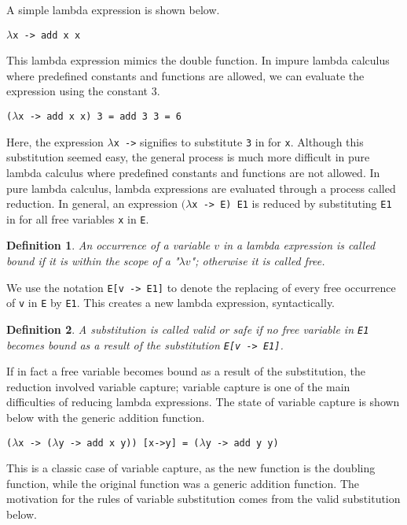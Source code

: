 \documentclass[11pt]{article}
\newtheorem{definition}{Definition}
\begin{document}
A simple lambda expression is shown below.


\hspace{2cm}\texttt{$\lambda$x -> add x x}


This lambda expression mimics the double function. In impure lambda calculus where predefined constants and functions are allowed, we can evaluate the expression using the constant 3.

\hspace{2cm}\texttt{($\lambda$x -> add x x) 3 = add 3 3 = 6}

Here, the expression \texttt{$\lambda$x ->} signifies to substitute \texttt{3} in for \texttt{x}. Although this substitution seemed easy, the general process is much more difficult in pure lambda calculus where predefined constants and functions are not allowed. In pure lambda calculus, lambda expressions are evaluated through a process called reduction. In general, an expression \texttt{$(\lambda$x -> E) E1} is reduced by substituting \texttt{E1} in for all free variables \texttt{x} in \texttt{E}. 

\begin{definition}
An occurrence of a variable $v$ in a lambda expression is called bound if it is within the scope of a "$\lambda v$"; otherwise it is called free.
\end{definition}

We use the notation \texttt{E[v -> E1]} to denote the replacing of every free occurrence of \texttt{v} in \texttt{E} by \texttt{E1}. This creates a new lambda expression, syntactically.

\begin{definition}
A substitution is called valid or safe if no free variable in \emph{\texttt{E1}} becomes bound as a result of the substitution \emph{\texttt{E[v -> E1]}}.
\end{definition}

If in fact a free variable becomes bound as a result of the substitution, the reduction involved variable capture; variable capture is one of the main difficulties of reducing lambda expressions. The state of variable capture is shown below with the generic addition function. 

\hspace{2cm}\texttt{($\lambda$x -> ($\lambda$y -> add x y)) [x->y] = ($\lambda$y -> add y y)}

This is a classic case of variable capture, as the new function is the doubling function, while the original function was a generic addition function. The motivation for the rules of variable substitution comes from the valid substitution below. 
\end{document}
